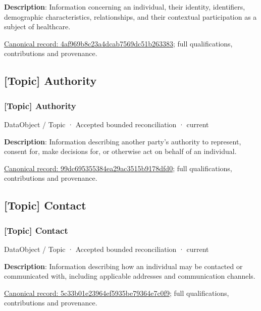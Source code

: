 \textbf{Description}: Information concerning an individual, their identity, identifiers, demographic characteristics, relationships, and their contextual participation as a subject of healthcare.


{\footnotesize \href{../../../../continuum/application/data-object/topic/4af969b8c23a4dcab7569dc51b263383.md}{Canonical record: 4af969b8c23a4dcab7569dc51b263383}; full qualifications, contributions and provenance.}\par
\subsection{[Topic] Authority}

\subsubsection{[Topic] Authority}

\label{element:99dc695355384ea29ac3515b9178dfd0}
{\small DataObject / Topic · Accepted bounded reconciliation · current}\par

\textbf{Description}: Information describing another party's authority to represent, consent for, make decisions for, or otherwise act on behalf of an individual.


{\footnotesize \href{../../../../continuum/application/data-object/topic/99dc695355384ea29ac3515b9178dfd0.md}{Canonical record: 99dc695355384ea29ac3515b9178dfd0}; full qualifications, contributions and provenance.}\par
\subsection{[Topic] Contact}

\subsubsection{[Topic] Contact}

\label{element:5c33b01e23964ef5935be79364e7c0f9}
{\small DataObject / Topic · Accepted bounded reconciliation · current}\par

\textbf{Description}: Information describing how an individual may be contacted or communicated with, including applicable addresses and communication channels.


{\footnotesize \href{../../../../continuum/application/data-object/topic/5c33b01e23964ef5935be79364e7c0f9.md}{Canonical record: 5c33b01e23964ef5935be79364e7c0f9}; full qualifications, contributions and provenance.}\par
